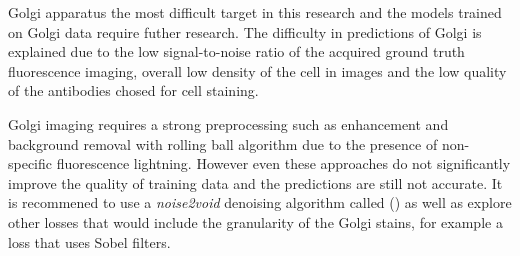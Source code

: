 Golgi apparatus the most difficult target in this research and the models trained on Golgi data require futher research. The difficulty in predictions of Golgi is explained due to the low signal-to-noise ratio of the acquired ground truth fluorescence imaging, overall low density of the cell in images and the low quality of the antibodies chosed for cell staining. 

Golgi imaging requires a strong preprocessing such as enhancement and background removal with rolling ball algorithm due to the presence of non-specific fluorescence lightning. However even these approaches do not significantly improve the quality of training data and the predictions are still not accurate. It is recommened to use a \textit{noise2void} denoising algorithm called (\cite{noise2void}) as well as explore other losses that would include the granularity of the Golgi stains, for example a loss that uses Sobel filters.
